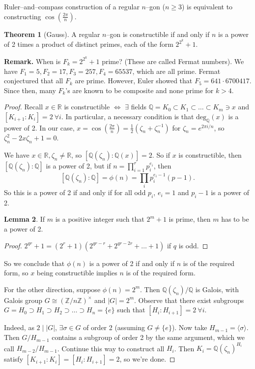 \documentclass{article}
\theoremstyle{definition}
\newtheorem{theorem}{Theorem}[section]
\newtheorem{lemma}[theorem]{Lemma}
\begin{document}
Ruler--and--compass construction of a regular $n$--gon ($n\ge 3$) is equivalent to constructing $\cos(\frac{2\pi}{n})$.

\begin{theorem}[Gauss]
    A regular $n$--gon is constructible if and only if $n$ is a power of 2 times a product of distinct primes, each of the form $2^{2^k}+1$.
\end{theorem}
\textbf{Remark.} When is $F_k=2^{2^k}+1$ prime? (These are called Fermat numbers). We have $F_1=5,F_2=17,F_3=257,F_4=65537$, which are all prime. Fermat conjectured that all $F_k$ are prime. However, Euler showed that $F_5 = 641 \cdot 6700417$. Since then, many $F_k$'s are known to be composite and none prime for $k>4$.


\begin{proof}
    Recall $x \in \mathbb{R}$ is constructible $\iff$ $\exists $ fields $\mathbb{Q}=K_0 \subset K_1 \subset \ldots \subset K_m \ni x$ and $[K_{i+1}:K_i]=2 ~\forall i$. In particular, a necessary condition is that $\text{deg}_\mathbb{Q}(x)$ is a power of 2. In our case, $x=\cos(\frac{2\pi}{n}) = \frac{1}{2}(\zeta_n+\zeta_n^{-1})$ for $\zeta_n = e^{2\pi i/n}$, so $\zeta_n^2 - 2x \zeta_n + 1 =0.$

    We have $x \in \mathbb{R}, \zeta_n \neq \mathbb{R}$, so $[\mathbb{Q}(\zeta_n):\mathbb{Q}(x)]=2$. So if $x$ is constructible, then $[\mathbb{Q}(\zeta_n):\mathbb{Q}]$ is a power of 2, but if $n=\prod_{i=1}^{r} p_i^{e_i}$, then
    \[
    [\mathbb{Q}(\zeta_n):\mathbb{Q}] = \phi(n) = \prod_{i}^{} p_i^{e_i-1}(p-1).
    \]
    So this is a power of 2 if and only if for all odd $p_i$, $e_i=1$ and $p_i-1$ is a power of 2.
    \begin{lemma}
        If $m$ is a positive integer such that $2^m+1$ is prime, then $m$ has to be a power of 2.
    \end{lemma}
    \begin{proof}
        $2^{qr}+1 = (2^r+1)(2^{qr-r}+2^{qr-2r}+\ldots+1)$ if $q$ is odd.
    \end{proof}
    So we conclude that $\phi(n)$ is a power of 2 if and only if $n$ is of the required form, so $x$ being constructible implies $n$ is of the required form.
    \vspace{1mm}
    
    For the other direction, suppose $\phi(n)=2^m$. Then $\mathbb{Q}(\zeta_n)/\mathbb{Q}$ is Galois, with Galois group $G \cong (\mathbb{Z}/n\mathbb{Z})^\times$ and $|G|=2^m$. Observe that there exist subgroups $G = H_0 \supset H_1 \supset H_2 \supset \ldots \supset H_n = \{e\}$ such that $[H_i:H_{i+1}]=2 ~\forall i$.

    Indeed, as $2 \mid |G|$, $\exists \sigma \in G$ of order 2 (assuming $G \neq \{e\}$). Now take $H_{m-1} = \langle \sigma \rangle$. Then $G/H_{m-1}$ contains  a subgroup of order 2 by the same argument, which we call $H_{m-2}/H_{m-1}$. Continue this way to construct all $H_i$. Then $K_i = \mathbb{Q}(\zeta_n)^{H_i}$ satisfy $[K_{i+1}:K_i]= [H_i : H_{i+1}]=2$, so we're done.
\end{proof}
\end{document}
